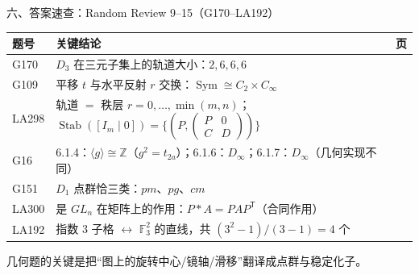 \documentclass[aspectratio=169,10pt,fontset=none]{ctexbeamer}
\begin{document}
\begin{frame}[t]{六、答案速查：Random Review 9--15（G170--LA192）}
  \centering
  \scriptsize
  \setlength{\tabcolsep}{3pt}
  \renewcommand{\arraystretch}{1.22}
  \begin{tabular}{@{}l p{10.0cm} c@{}}
    \toprule
    题号 & 关键结论 & 页\\
    \midrule
    G170 & $D_3$ 在三元子集上的轨道大小：$2,6,6,6$ & \pageref{ex:G170}\\
    G109 & 平移 $t$ 与水平反射 $r$ 交换：$\operatorname{Sym}\cong C_2\times C_\infty$ & \pageref{ex:G109}\\
    LA298 & 轨道 $=$ 秩层 $r=0,\ldots,\min(m,n)$；$\operatorname{Stab}([I_m\mid0])=\{(P,\begin{pmatrix}P&0\\C&D\end{pmatrix})\}$ & \pageref{ex:LA298}\\
    G16 & 6.1.4：$\langle g\rangle\cong\mathbb Z$（$g^2=t_{2a}$）；6.1.6：$D_\infty$；6.1.7：$D_\infty$（几何实现不同） & \pageref{ex:G16}\\
    G151 & $D_1$ 点群恰三类：$pm$、$pg$、$cm$ & \pageref{ex:G151}\\
    LA300 & 是 $GL_n$ 在矩阵上的作用：$P*A=PAP^{\mathsf T}$（合同作用） & \pageref{ex:LA300}\\
    LA192 & 指数 $3$ 子格 $\leftrightarrow$ $\mathbb F_3^2$ 的直线，共 $(3^2-1)/(3-1)=4$ 个 & \pageref{ex:LA192}\\
    \bottomrule
  \end{tabular}
  \vspace{0.3em}
  {\scriptsize\color{ink!70} 几何题的关键是把“图上的旋转中心/镜轴/滑移”翻译成点群与稳定化子。}
\end{frame}
\end{document}
